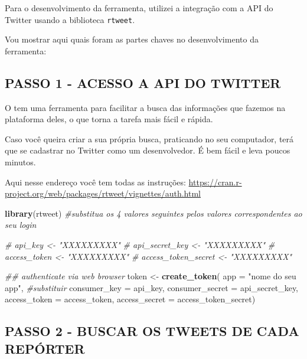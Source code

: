 \documentclass[
]{book}
\newenvironment{Shaded}{\begin{snugshade}}{\end{snugshade}}
\newcommand{\CommentTok}[1]{\textcolor[rgb]{0.56,0.35,0.01}{\textit{#1}}}
\newcommand{\DataTypeTok}[1]{\textcolor[rgb]{0.13,0.29,0.53}{#1}}
\newcommand{\KeywordTok}[1]{\textcolor[rgb]{0.13,0.29,0.53}{\textbf{#1}}}
\newcommand{\NormalTok}[1]{#1}
\newcommand{\StringTok}[1]{\textcolor[rgb]{0.31,0.60,0.02}{#1}}
\begin{document}
Para o desenvolvimento da ferramenta, utilizei a integração com a API do
Twitter usando a biblioteca \texttt{rtweet}.

Vou mostrar aqui quais foram as partes chaves no desenvolvimento da
ferramenta:

\hypertarget{passo-1---acesso-a-api-do-twitter}{%
\subsection{PASSO 1 - ACESSO A API DO
TWITTER}\label{passo-1---acesso-a-api-do-twitter}}

O tem uma ferramenta para facilitar a busca das informações que fazemos
na plataforma deles, o que torna a tarefa mais fácil e rápida.

Caso você queira criar a sua própria busca, praticando no seu
computador, terá que se cadastrar no Twitter como um desenvolvedor. É
bem fácil e leva poucos minutos.

Aqui nesse endereço você tem todas as instruções:
\url{https://cran.r-project.org/web/packages/rtweet/vignettes/auth.html}

\begin{Shaded}
\begin{Highlighting}[]
\KeywordTok{library}\NormalTok{(rtweet)}
\CommentTok{#substitua os 4 valores seguintes pelos valores correspondentes ao seu login}

\CommentTok{# api_key <- "XXXXXXXXX"}
\CommentTok{# api_secret_key <- "XXXXXXXXX"}
\CommentTok{# access_token <- "XXXXXXXXX"}
\CommentTok{# access_token_secret <- "XXXXXXXXX"}

\CommentTok{## authenticate via web browser}
\NormalTok{token <-}\StringTok{ }\KeywordTok{create_token}\NormalTok{(}
  \DataTypeTok{app =} \StringTok{"nome do seu app"}\NormalTok{, }\CommentTok{#substituir}
  \DataTypeTok{consumer_key =}\NormalTok{ api_key,}
  \DataTypeTok{consumer_secret =}\NormalTok{ api_secret_key,}
  \DataTypeTok{access_token =}\NormalTok{ access_token,}
  \DataTypeTok{access_secret =}\NormalTok{ access_token_secret)}
\end{Highlighting}
\end{Shaded}

\hypertarget{passo-2---buscar-os-tweets-de-cada-repuxf3rter}{%
\subsection{PASSO 2 - BUSCAR OS TWEETS DE CADA
REPÓRTER}\label{passo-2---buscar-os-tweets-de-cada-repuxf3rter}}
\end{document}
